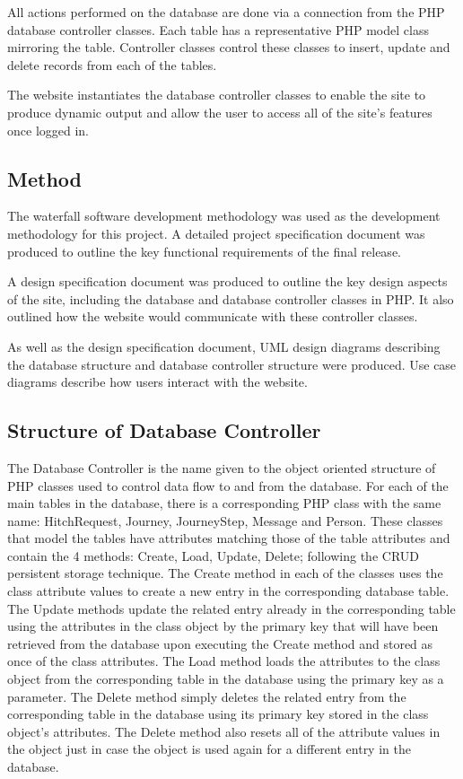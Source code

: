 		All actions performed on the database are done via a connection from the PHP database controller classes. Each table has a representative PHP model class mirroring the table. Controller classes control these classes to insert, update and delete records from each of the tables. 
		
		The website instantiates the database controller classes to enable the site to produce dynamic output and allow the user to access all of the site's features once logged in.
	\subsection{Method}
		The waterfall software development methodology was used as the development methodology for this project. A detailed project specification document was produced to outline the key functional requirements of the final release. 
		
		A design specification document was produced to outline the key design aspects of the site, including the database and database controller classes in PHP. It also outlined how the website would communicate with these controller classes.
		
		As well as the design specification document, UML design diagrams describing the database structure and database controller structure were produced. Use case diagrams describe how users interact with the website.
	\subsection{Structure of Database Controller}
		The Database Controller is the name given to the object oriented structure of PHP classes used to control data flow to and from the database. For each of the main tables in the database, there is a corresponding PHP class with the same name: Hitch\textunderscore Request, Journey, Journey\textunderscore Step, Message and Person. These classes that model the tables have attributes matching those of the table attributes and contain the 4 methods: Create, Load, Update, Delete; following the CRUD persistent storage technique\cite{crud_technique}. The Create method in each of the classes uses the class attribute values to create a new entry in the corresponding database table. The Update methods update the related entry already in the corresponding table using the attributes in the class object by the primary key that will have been retrieved from the database upon executing the Create method and stored as once of the class attributes. The Load method loads the attributes to the class object from the corresponding table in the database using the primary key as a parameter. The Delete method simply deletes the related entry from the corresponding table in the database using its primary key stored in the class object's attributes. The Delete method also resets all of the attribute values in the object just in case the object is used again for a different entry in the database. 
		

